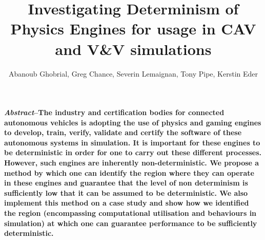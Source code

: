 \documentclass[runningheads,twocolumn,a4paper,10pt]{llncs}
\begin{document}

\mainmatter


\title{Investigating Determinism of Physics Engines for usage in CAV and V\&V simulations}




\author{Abanoub Ghobrial, Greg Chance, Severin Lemaignan, Tony Pipe, Kerstin Eder}

\maketitle

\makeatletter
\renewcommand\subsubsection{\@startsection{subsubsection}{3}{\z@}%
                       {-18\p@ \@plus -4\p@ \@minus -4\p@}%
                       {4\p@ \@plus 2\p@ \@minus 2\p@}%
                       {\normalfont\normalsize\bfseries\boldmath
                        \rightskip=\z@ \@plus 8em\pretolerance=10000 }}
\makeatother



\textbf{\textit{Abstract}--The industry and certification bodies for connected autonomous vehicles is adopting the use of physics and gaming engines to develop, train, verify, validate and certify the software of these autonomous systems in simulation. It is important for these engines to be deterministic in order for one to carry out these different processes. However, such engines are inherently non-deterministic. We propose a method by which one can identify the region where they can operate in these engines and guarantee that the level of non determinism is sufficiently low that it can be assumed to be deterministic. We also implement this method on a case study and show how we identified the region (encompassing computational utilisation and behaviours in simulation) at which one can guarantee performance to be sufficiently deterministic.}  


\end{document}

